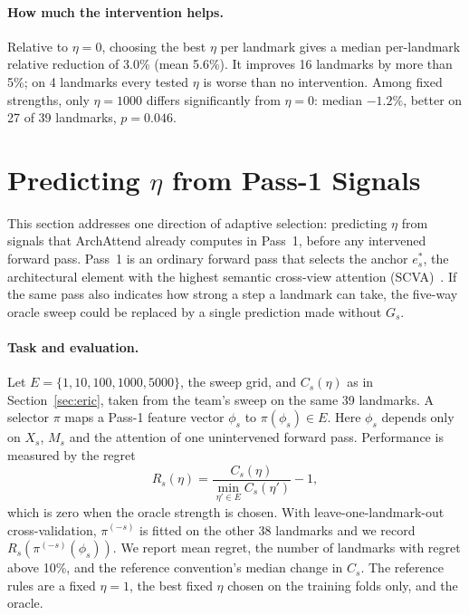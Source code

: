 \documentclass[sigconf,nonacm]{acmart}
\begin{document}
\paragraph{How much the intervention helps.} Relative to $\eta=0$, choosing the best $\eta$ per landmark gives a median per-landmark relative reduction of 3.0\% (mean 5.6\%). It improves 16 landmarks by more than 5\%; on 4 landmarks every tested $\eta$ is worse than no intervention. Among fixed strengths, only $\eta=1000$ differs significantly from $\eta=0$: median $-1.2\%$, better on 27 of 39 landmarks, $p=0.046$.

\section{Predicting \texorpdfstring{$\eta$}{eta} from Pass-1 Signals}
\label{sec:eric-pass1}
This section addresses one direction of adaptive selection: predicting $\eta$ from signals that ArchAttend already computes in Pass~1, before any intervened forward pass. Pass~1 is an ordinary forward pass that selects the anchor $e_s^*$, the architectural element with the highest semantic cross-view attention (SCVA)~\cite{archworld}. If the same pass also indicates how strong a step a landmark can take, the five-way oracle sweep could be replaced by a single prediction made without $G_s$.

\paragraph{Task and evaluation.} Let $E=\{1,10,100,1000,5000\}$, the sweep grid, and $C_s(\eta)$ as in Section~\ref{sec:eric}, taken from the team's sweep on the same 39 landmarks. A selector $\pi$ maps a Pass-1 feature vector $\phi_s$ to $\pi(\phi_s)\in E$. Here $\phi_s$ depends only on $X_s$, $M_s$ and the attention of one unintervened forward pass. Performance is measured by the regret
\begin{equation}
R_s(\eta)=\frac{C_s(\eta)}{\min_{\eta'\in E}C_s(\eta')}-1,
\label{eq:regret}
\end{equation}
which is zero when the oracle strength is chosen. With leave-one-landmark-out cross-validation, $\pi^{(-s)}$ is fitted on the other 38 landmarks and we record $R_s(\pi^{(-s)}(\phi_s))$. We report mean regret, the number of landmarks with regret above 10\%, and the reference convention's median change in $C_s$. The reference rules are a fixed $\eta=1$, the best fixed $\eta$ chosen on the training folds only, and the oracle.
\end{document}
